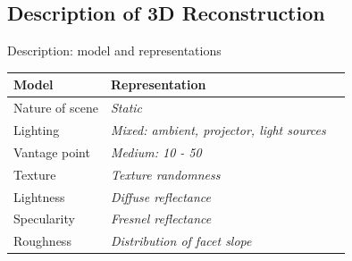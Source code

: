 \documentclass[10pt]{beamer}
\begin{document}
\subsection{Description of 3D Reconstruction}
\begin{frame}{Description: model and representations}

\begin{table}
  \centering
  \begin{tabular}{l|ll}
  \toprule
  \textbf{Model} & \textbf{Representation}\\
  \midrule
  Nature of scene & \textit{Static} \\
  Lighting & \textit{Mixed: ambient, projector, light sources} \\
  Vantage point & \textit{Medium: 10 - 50} \\
  Texture & \textit{Texture randomness}\\
  Lightness & \textit{Diffuse reflectance}\\
  Specularity & \textit{Fresnel reflectance}\\
  Roughness & \textit{Distribution of facet slope}\\
  \bottomrule
  \end{tabular}
\end{table}

\end{frame}
\end{document}
